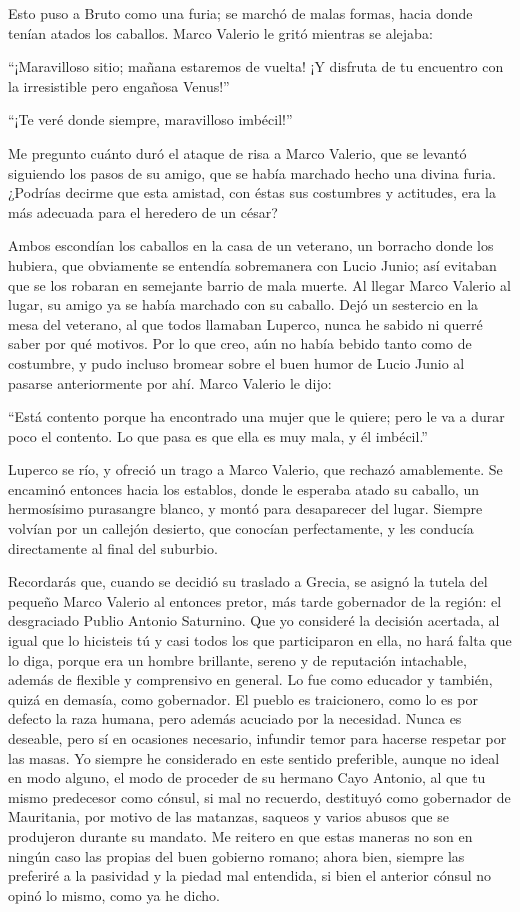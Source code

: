 \documentclass[11pt,openany]{book}
\begin{document}
Esto puso a Bruto como una furia; se marchó de malas formas, hacia donde tenían atados los caballos. Marco Valerio le gritó mientras se alejaba: 

“¡Maravilloso sitio; mañana estaremos de vuelta! ¡Y disfruta de tu encuentro con la irresistible pero engañosa Venus!” 

“¡Te veré donde siempre, maravilloso imbécil!” 

Me pregunto cuánto duró el ataque de risa a Marco Valerio, que se levantó siguiendo los pasos de su amigo, que se había marchado hecho una divina furia. ¿Podrías decirme que esta amistad, con éstas sus costumbres y actitudes, era la más adecuada para el heredero de un césar? 

Ambos escondían los caballos en la casa de un veterano, un borracho donde los hubiera, que obviamente se entendía sobremanera con Lucio Junio; así evitaban que se los robaran en semejante barrio de mala muerte. Al llegar Marco Valerio al lugar, su amigo ya se había marchado con su caballo. Dejó un sestercio en la mesa del veterano, al que todos llamaban Luperco, nunca he sabido ni querré saber por qué motivos. Por lo que creo, aún no había bebido tanto como de costumbre, y pudo incluso bromear sobre el buen humor de Lucio Junio al pasarse anteriormente por ahí. Marco Valerio le dijo: 

“Está contento porque ha encontrado una mujer que le quiere; pero le va a durar poco el contento. Lo que pasa es que ella es muy mala, y él imbécil.” 

Luperco se río, y ofreció un trago a Marco Valerio, que rechazó amablemente. Se encaminó entonces hacia los establos, donde le esperaba atado su caballo, un hermosísimo purasangre blanco, y montó para desaparecer del lugar. Siempre volvían por un callejón desierto, que conocían perfectamente, y les conducía directamente al final del suburbio. 

Recordarás que, cuando se decidió su traslado a Grecia, se asignó la tutela del pequeño Marco Valerio al entonces pretor, más tarde gobernador de la región: el desgraciado Publio Antonio Saturnino. Que yo consideré la decisión acertada, al igual que lo hicisteis tú y casi todos los que participaron en ella, no hará falta que lo diga, porque era un hombre brillante, sereno y de reputación intachable, además de flexible y comprensivo en general. Lo fue como educador y también, quizá en demasía, como gobernador. El pueblo es traicionero, como lo es por defecto la raza humana, pero además acuciado por la necesidad. Nunca es deseable, pero sí en ocasiones necesario, infundir temor para hacerse respetar por las masas. Yo siempre he considerado en este sentido preferible, aunque no ideal en modo alguno, el modo de proceder de su hermano Cayo Antonio, al que tu mismo predecesor como cónsul, si mal no recuerdo, destituyó como gobernador de Mauritania, por motivo de las matanzas, saqueos y varios abusos que se produjeron durante su mandato. Me reitero en que estas maneras no son en ningún caso las propias del buen gobierno romano; ahora bien, siempre las preferiré a la pasividad y la piedad mal entendida, si bien el anterior cónsul no opinó lo mismo, como ya he dicho.
\end{document}

